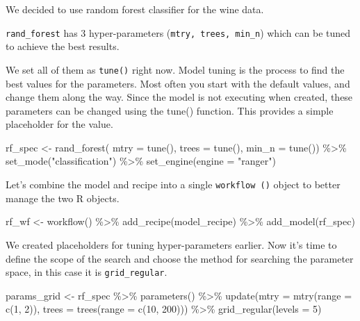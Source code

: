 \documentclass[
]{book}
\newenvironment{Shaded}{\begin{snugshade}}{\end{snugshade}}
\newcommand{\AttributeTok}[1]{\textcolor[rgb]{0.77,0.63,0.00}{#1}}
\newcommand{\DecValTok}[1]{\textcolor[rgb]{0.00,0.00,0.81}{#1}}
\newcommand{\FunctionTok}[1]{\textcolor[rgb]{0.00,0.00,0.00}{#1}}
\newcommand{\NormalTok}[1]{#1}
\newcommand{\OtherTok}[1]{\textcolor[rgb]{0.56,0.35,0.01}{#1}}
\newcommand{\SpecialCharTok}[1]{\textcolor[rgb]{0.00,0.00,0.00}{#1}}
\newcommand{\StringTok}[1]{\textcolor[rgb]{0.31,0.60,0.02}{#1}}
\begin{document}
We decided to use random forest classifier for the wine data.

\texttt{rand\_forest} has 3 hyper-parameters (\texttt{mtry,\ trees,\ min\_n}) which can be tuned to achieve the best results.

We set all of them as \texttt{tune()} right now. Model tuning is the process to find the best values for the parameters. Most often you start with the default values, and change them along the way. Since the model is not executing when created, these parameters can be changed using the tune() function. This provides a simple placeholder for the value.

\begin{Shaded}
\begin{Highlighting}[]
\NormalTok{rf\_spec }\OtherTok{\textless{}{-}} \FunctionTok{rand\_forest}\NormalTok{(}
  \AttributeTok{mtry =} \FunctionTok{tune}\NormalTok{(),}
  \AttributeTok{trees =} \FunctionTok{tune}\NormalTok{(),}
  \AttributeTok{min\_n =} \FunctionTok{tune}\NormalTok{()) }\SpecialCharTok{\%\textgreater{}\%}
  \FunctionTok{set\_mode}\NormalTok{(}\StringTok{"classification"}\NormalTok{) }\SpecialCharTok{\%\textgreater{}\%} 
  \FunctionTok{set\_engine}\NormalTok{(}\AttributeTok{engine =} \StringTok{"ranger"}\NormalTok{)}
\end{Highlighting}
\end{Shaded}

Let's combine the model and recipe into a single \texttt{workflow\ ()} object to better manage the two R objects.

\begin{Shaded}
\begin{Highlighting}[]
\NormalTok{rf\_wf }\OtherTok{\textless{}{-}} \FunctionTok{workflow}\NormalTok{() }\SpecialCharTok{\%\textgreater{}\%}
  \FunctionTok{add\_recipe}\NormalTok{(model\_recipe) }\SpecialCharTok{\%\textgreater{}\%} 
  \FunctionTok{add\_model}\NormalTok{(rf\_spec)}
\end{Highlighting}
\end{Shaded}

We created placeholders for tuning hyper-parameters earlier. Now it's time to define the scope of the search and choose the method for searching the parameter space, in this case it is \texttt{grid\_regular}.

\begin{Shaded}
\begin{Highlighting}[]
\NormalTok{params\_grid }\OtherTok{\textless{}{-}}\NormalTok{ rf\_spec }\SpecialCharTok{\%\textgreater{}\%}
  \FunctionTok{parameters}\NormalTok{() }\SpecialCharTok{\%\textgreater{}\%}
  \FunctionTok{update}\NormalTok{(}\AttributeTok{mtry =} \FunctionTok{mtry}\NormalTok{(}\AttributeTok{range =} \FunctionTok{c}\NormalTok{(}\DecValTok{1}\NormalTok{, }\DecValTok{2}\NormalTok{)),}
         \AttributeTok{trees =} \FunctionTok{trees}\NormalTok{(}\AttributeTok{range =} \FunctionTok{c}\NormalTok{(}\DecValTok{10}\NormalTok{, }\DecValTok{200}\NormalTok{))) }\SpecialCharTok{\%\textgreater{}\%} 
  \FunctionTok{grid\_regular}\NormalTok{(}\AttributeTok{levels =} \DecValTok{5}\NormalTok{)}
\end{Highlighting}
\end{Shaded}
\end{document}
